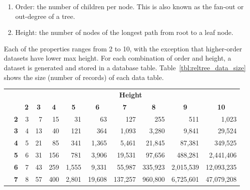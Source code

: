 \begin{enumerate}
\item Order: the number of children per node. This is also known as the fan-out or out-degree of a tree.
\item Height: the number of nodes of the longest path from root to a leaf node.
\end{enumerate} 

Each of the properties ranges from 2 to 10, with the exception that higher-order datasets have lower max height. For each combination of order and height, a dataset is generated and stored in a database table. Table~\ref{tbl:reltree_data_size} shows the size (number of records) of each data table.

\newcommand*\rot{\rotatebox{90}}

\begin{table}[h]
\centering
\begin{tabular}{lc|r|r|r|r|r|r|r|r|r|}
\cline{3-11}
 & \multicolumn{1}{l}{} & \multicolumn{9}{|c|}{\textbf{Height}} \\ \cline{3-11} 
 & \multicolumn{1}{l}{} & \multicolumn{1}{|c}{\textbf{2}} & \multicolumn{1}{|c}{\textbf{3}} & \multicolumn{1}{|c}{\textbf{4}} & \multicolumn{1}{|c}{\textbf{5}} & \multicolumn{1}{|c}{\textbf{6}} & \multicolumn{1}{|c}{\textbf{7}} & \multicolumn{1}{|c}{\textbf{8}} & \multicolumn{1}{|c}{\textbf{9}} & \multicolumn{1}{|c|}{\textbf{10}} \\ \hline
\multicolumn{1}{|l}{\multirow{9}{*}{\rot{\textbf{Order}}}} & \multicolumn{1}{|c|}{\textbf{2}} & 3 & 7 & 15 & 31 & 63 & 127 & 255 & 511 & 1,023 \\ \cline{2-11} 
\multicolumn{1}{|l}{\textbf{}} & \multicolumn{1}{|c|}{\textbf{3}} & 4 & 13 & 40 & 121 & 364 & 1,093 & 3,280 & 9,841 & 29,524 \\ \cline{2-11} 
\multicolumn{1}{|l}{\textbf{}} & \multicolumn{1}{|c|}{\textbf{4}} & 5 & 21 & 85 & 341 & 1,365 & 5,461 & 21,845 & 87,381 & 349,525 \\ \cline{2-11} 
\multicolumn{1}{|l}{\textbf{}} & \multicolumn{1}{|c|}{\textbf{5}} & 6 & 31 & 156 & 781 & 3,906 & 19,531 & 97,656 & 488,281 & 2,441,406 \\ \cline{2-11} 
\multicolumn{1}{|l}{\textbf{}} & \multicolumn{1}{|c|}{\textbf{6}} & 7 & 43 & 259 & 1,555 & 9,331 & 55,987 & 335,923 & 2,015,539 & 12,093,235 \\ \cline{2-11} 
\multicolumn{1}{|l}{\textbf{}} & \multicolumn{1}{|c|}{\textbf{7}} & 8 & 57 & 400 & 2,801 & 19,608 & 137,257 & 960,800 & 6,725,601 & 47,079,208 \\ \cline{2-11} 

\end{tabular}
\end{table}
